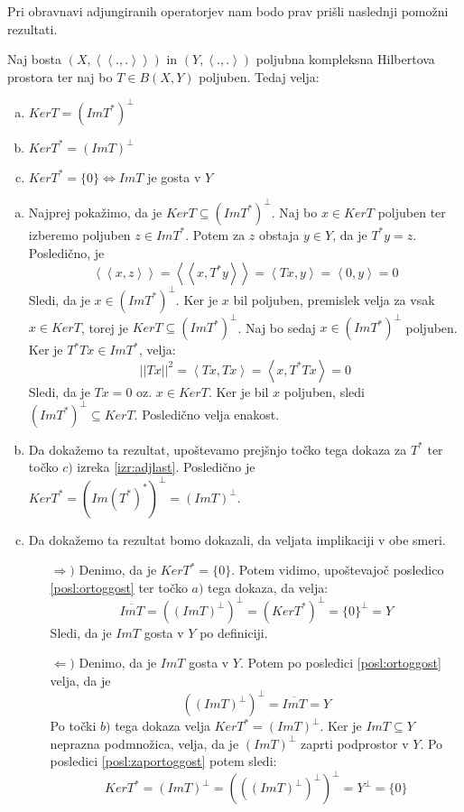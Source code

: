 \documentclass[mat2]{matdelo}
\newcommand{\abs}[1]{\ensuremath{\lvert #1 \rvert}}
\newcommand{\norm}[1]{\abs{\abs{#1}}}
\newcommand{\Sp}[2]{\ensuremath{\left<#1, #2\right>}}
\newcommand{\Spp}[2]{\ensuremath{\left<\left<#1, #2\right>\right>}}
\begin{document}
			Pri obravnavi adjungiranih operatorjev nam bodo prav prišli naslednji pomožni rezultati.
			\begin{lema}
				\label{lem:adjlast2}
				Naj bosta $(X, \Spp{.}{.})$ in $(Y, \Sp{.}{.})$ poljubna kompleksna Hilbertova prostora ter naj bo $T\in B(X, Y)$ poljuben. Tedaj velja: \begin{enumerate}[a)]
					\item $KerT = (ImT^*)^{\bot}$
					\item $KerT^* = (ImT)^{\bot}$
					\item $KerT^* = \{0\} \iff ImT$ je gosta v $Y$
				\end{enumerate}
			\end{lema}
			
			\begin{dokaz}
				\begin{enumerate}[a)]
					\item Najprej pokažimo, da je $KerT \subseteq (ImT^*)^\bot$. Naj bo $x\in KerT$ poljuben ter izberemo poljuben $z\in ImT^*$. Potem za $z$ obstaja $y\in Y$, da je $T^*y = z$. Posledično, je $$\Spp{x}{z} = \Spp{x}{T^*y} = \Sp{Tx}{y} = \Sp{0}{y} = 0$$
					Sledi, da je $x\in (ImT^*)^\bot$. Ker je $x$ bil poljuben, premislek velja za vsak $x\in KerT$, torej je $KerT \subseteq (ImT^*)^\bot$.
					Naj bo sedaj $x\in (ImT^*)^\bot$ poljuben. Ker je $T^*Tx \in ImT^*$, velja: $$\norm{Tx}^2 = \Sp{Tx}{Tx} = \Sp{x}{T^*Tx}= 0$$
					Sledi, da je $Tx = 0$ oz. $x\in KerT$. Ker je bil $x$ poljuben, sledi $(ImT^*)^\bot \subseteq KerT$. Posledično velja enakost.
					\item Da dokažemo ta rezultat, upoštevamo prejšnjo točko tega dokaza za $T^*$ ter točko $c)$ izreka \ref{izr:adjlast}. Posledično je $KerT^* = (Im(T^*)^*)^\bot = (ImT)^\bot$.
					\item Da dokažemo ta rezultat bomo dokazali, da veljata implikaciji v obe smeri. \begin{itemize}
						\item[$\Rightarrow)$] Denimo, da je $KerT^* = \{0\}$. Potem vidimo, upoštevajoč posledico \ref{posl:ortoggost} ter točko $a)$ tega dokaza, da velja: $$\overline{ImT} = ((ImT)^\bot)^\bot = (KerT^*)^\bot = \{0\}^\bot = Y$$
						Sledi, da je $ImT$ gosta v $Y$ po definiciji.
						\item[$\Leftarrow)$] Denimo, da je $ImT$ gosta v $Y$. Potem po posledici \ref{posl:ortoggost} velja, da je $$((ImT)^{\bot})^\bot = \overline{ImT} = Y$$ Po točki $b)$ tega dokaza velja $KerT^* = (ImT)^\bot$. Ker je $ImT\subseteq Y$ neprazna podmnožica, velja, da je $(ImT)^\bot$ zaprti podprostor v $Y$. Po posledici \ref{posl:zaportoggost} potem sledi: $$KerT^* = (ImT)^\bot =(((ImT)^\bot)^\bot)^\bot = Y^\bot = \{0\}$$
					\end{itemize} 
					
				\end{enumerate}
			\end{dokaz}
\end{document}
